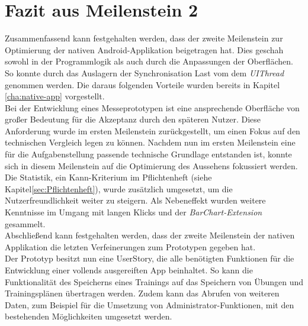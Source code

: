 \section{Fazit aus Meilenstein 2}
\label{sec:fazit-meilenstein-2}
Zusammenfassend kann festgehalten werden, dass der zweite Meilenstein zur Optimierung der nativen Android-Applikation beigetragen hat. Dies geschah sowohl in der Programmlogik als auch durch die Anpassungen der Oberflächen. \\
So konnte durch das Auslagern der Synchronisation Last vom dem \textit{UIThread} genommen werden. Die daraus folgenden Vorteile wurden bereits in Kapitel \ref{cha:native-app} vorgestellt.\\
Bei der Entwicklung eines Messeprototypen ist eine ansprechende Oberfläche von großer Bedeutung für die Akzeptanz durch den späteren Nutzer. Diese Anforderung wurde im ersten Meilenstein zurückgestellt, um einen Fokus auf den technischen Vergleich legen zu können. Nachdem nun im ersten Meilenstein eine für die Aufgabenstellung passende technische Grundlage entstanden ist, konnte sich in diesem Meilenstein auf die Optimierung des Aussehens fokussiert werden.\\
Die Statistik, ein Kann-Kriterium im Pflichtenheft (siehe Kapitel\ref{sec:Pflichtenheft}), wurde zusätzlich umgesetzt, um die Nutzerfreundlichkeit weiter zu steigern. Als Nebeneffekt wurden weitere Kenntnisse im Umgang mit langen Klicks und der \textit{BarChart-Extension} gesammelt.\\
Abschließend kann festgehalten werden, dass der zweite Meilenstein der nativen Applikation die letzten Verfeinerungen zum Prototypen gegeben hat.\\
Der Prototyp besitzt nun eine \gls{UserStory}, die alle benötigten Funktionen für die Entwicklung einer vollends ausgereiften \gls{App} beinhaltet. So kann die Funktionalität des Speicherns eines Trainings auf das Speichern von Übungen und Trainingsplänen übertragen werden. Zudem kann das Abrufen von weiteren Daten, zum Beispiel für die Umsetzung von Administrator-Funktionen, mit den bestehenden Möglichkeiten umgesetzt werden.


